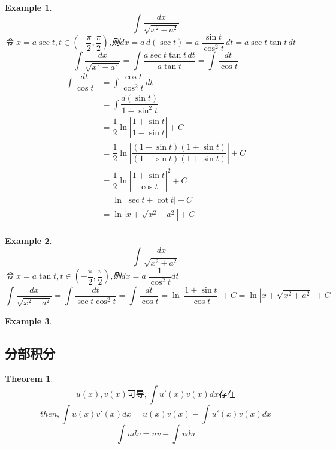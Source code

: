 \documentclass[11pt,hyperref,a4paper,UTF8]{ctexart}
\newtheorem{theorem}{Theorem}[subsection]
\newtheorem{example}{Example}[subsection]
\begin{document}
\begin{CJK}{UTF8}{gkai}
\begin{example}
  \[\int \dfrac{dx}{\sqrt{x^2 - a^2}}\]
  令 $x = a\sec t, t\in(-\dfrac{\pi}{2},\dfrac{\pi}{2})$,则$dx = a \,d(\sec t) = a~ \dfrac{\sin t}{\cos^2 t}\, dt = a \sec t \tan t \, dt$
  \[\int \dfrac{dx}{\sqrt{x^2 - a^2}} =\int \dfrac{a\sec t \tan t \, dt}{a \tan t} = \int \dfrac{dt}{\cos t}\]
  \[
  \begin{aligned}  
  \int \dfrac{dt}{\cos t} &= \int \dfrac{\cos t}{\cos^2 t}\, dt \\
  &= \int \dfrac{d(\sin t)}{1- \sin^2 t} \\
  &=\dfrac{1}{2}\ln \left| \dfrac{1 + \sin t}{1 - \sin t}\right| + C\\ 
  &=\dfrac{1}{2}\ln \left| \dfrac{(1 + \sin t)(1 + \sin t)}{(1 - \sin t)(1 + \sin t)}\right| + C\\ 
  &=\dfrac{1}{2}\ln \left| \dfrac{1 + \sin t}{\cos t}\right|^2 + C\\ 
  &=\ln \left|\sec t + \cot t \right| + C\\ 
  &= \ln| x + \sqrt{x^2 - a^2}| + C\\
  \end{aligned}
  \]
\end{example}

\begin{example}
  \[\int \dfrac{dx}{\sqrt{x^2 + a^2}}\]
  令 $x = a\tan t, t\in(-\dfrac{\pi}{2},\dfrac{\pi}{2})$,则$dx = a ~\dfrac{1}{\cos^2 t}dt$
  \[\int \dfrac{dx}{\sqrt{x^2 + a^2}} =\int \dfrac{dt}{\sec t \cos ^2 t }= \int \dfrac{dt}{\cos t} = \ln \left| \dfrac{1 + \sin t}{\cos t}\right| + C = \ln\left| x + \sqrt{x^2 + a^2}\right| + C\]
\end{example}

\begin{example}
  
\end{example}

\subsection{分部积分}

\begin{theorem}
  \[u(x),v(x)\text{可导},\int u'(x)v(x) dx\text{存在}\]
  \[then,\int u(x)v'(x) dx= u(x)v(x) - \int u'(x) v(x)dx\]
  \[\int u dv = uv- \int v du\]
\end{theorem}


\end{CJK}
\end{document}

